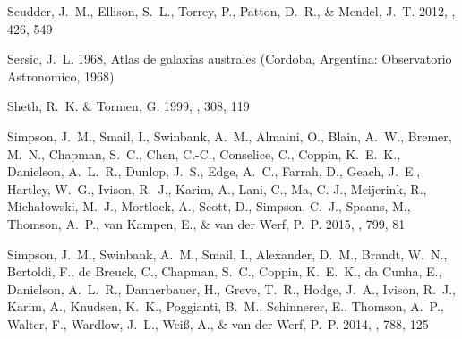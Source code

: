 \documentclass[iop]{emulateapj}
\begin{document}
\begin{thebibliography}{106}
{Scudder}, J.~M., {Ellison}, S.~L., {Torrey}, P., {Patton}, D.~R., \& {Mendel},
  J.~T. 2012, \mnras, 426, 549

{Sersic}, J.~L. 1968, {Atlas de galaxias australes} (Cordoba, Argentina:
  Observatorio Astronomico, 1968)

{Sheth}, R.~K. \& {Tormen}, G. 1999, \mnras, 308, 119

{Simpson}, J.~M., {Smail}, I., {Swinbank}, A.~M., {Almaini}, O., {Blain},
  A.~W., {Bremer}, M.~N., {Chapman}, S.~C., {Chen}, C.-C., {Conselice}, C.,
  {Coppin}, K.~E.~K., {Danielson}, A.~L.~R., {Dunlop}, J.~S., {Edge}, A.~C.,
  {Farrah}, D., {Geach}, J.~E., {Hartley}, W.~G., {Ivison}, R.~J., {Karim}, A.,
  {Lani}, C., {Ma}, C.-J., {Meijerink}, R., {Micha{\l}owski}, M.~J.,
  {Mortlock}, A., {Scott}, D., {Simpson}, C.~J., {Spaans}, M., {Thomson},
  A.~P., {van Kampen}, E., \& {van der Werf}, P.~P. 2015, \apj, 799, 81

{Simpson}, J.~M., {Swinbank}, A.~M., {Smail}, I., {Alexander}, D.~M., {Brandt},
  W.~N., {Bertoldi}, F., {de Breuck}, C., {Chapman}, S.~C., {Coppin}, K.~E.~K.,
  {da Cunha}, E., {Danielson}, A.~L.~R., {Dannerbauer}, H., {Greve}, T.~R.,
  {Hodge}, J.~A., {Ivison}, R.~J., {Karim}, A., {Knudsen}, K.~K., {Poggianti},
  B.~M., {Schinnerer}, E., {Thomson}, A.~P., {Walter}, F., {Wardlow}, J.~L.,
  {Wei{\ss}}, A., \& {van der Werf}, P.~P. 2014, \apj, 788, 125


\end{thebibliography}
\end{document}
